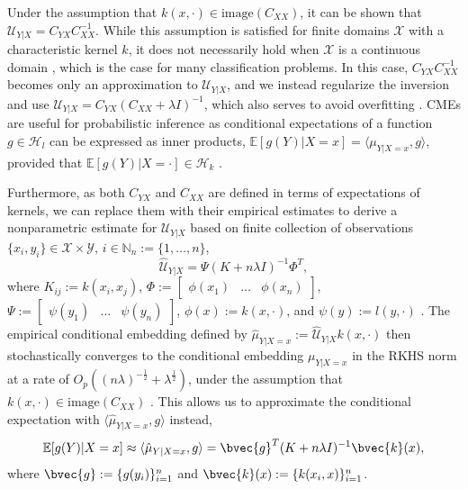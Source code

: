 \documentclass{llncs}
\begin{document}
	Under the assumption that $k(x, \cdot) \in \mathrm{image}(C_{XX})$, it can be shown that $\mathcal{U}_{Y | X} = C_{YX} C_{XX}^{-1}$. While this assumption is satisfied for finite domains $\mathcal{X}$ with a characteristic kernel $k$, it does not necessarily hold when $\mathcal{X}$ is a continuous domain \citep{fukumizu2004dimensionality}, which is the case for many classification problems. In this case, $C_{YX} C_{XX}^{-1}$ becomes only an approximation to $\mathcal{U}_{Y | X}$, and we instead regularize the inversion and use $\mathcal{U}_{Y | X} = C_{YX} (C_{XX} + \lambda I)^{-1}$, which also serves to avoid overfitting \citep{song2013kernel}. \glspl{CME} are useful for probabilistic inference as conditional expectations of a function $g \in \mathcal{H}_{l}$ can be expressed as inner products, $\mathbb{E}[g(Y) | X = x] = \langle \mu_{Y | X = x}, g \rangle$, provided that $\mathbb{E}[g(Y) | X = \cdot] \in \mathcal{H}_{k}$ \citep[Theorem 4]{song2009hilbert}.
	
	Furthermore, as both $C_{YX}$ and $C_{XX}$ are defined in terms of expectations of kernels, we can replace them with their empirical estimates to derive a nonparametric estimate for $\mathcal{U}_{Y | X}$ based on finite collection of observations $\{x_{i}, y_{i}\} \in \mathcal{X} \times \mathcal{Y}$, $i \in \mathbb{N}_{n} := \{1, \dots, n\}$,
	\begin{equation}
	\hat{\mathcal{U}}_{Y | X} = \Psi (K + n \lambda I)^{-1} \Phi^{T},
	\label{eq:empirical_conditional_embedding}
	\end{equation}
	where $K_{ij} := k(x_{i}, x_{j})$, $\Phi := \begin{bmatrix} \phi(x_{1}) & \dots & \phi(x_{n}) \end{bmatrix}$, $\Psi := \begin{bmatrix} \psi(y_{1}) & \dots & \psi(y_{n}) \end{bmatrix}$, $\phi(x) := k(x, \cdot)$, and $\psi(y) := l(y, \cdot)$ \citep{song2013kernel}. The empirical conditional embedding defined by $\hat{\mu}_{Y | X = x} := \hat{\mathcal{U}}_{Y | X} k(x, \cdot)$ then stochastically converges to the conditional embedding $\mu_{Y | X = x}$ in the RKHS norm at a rate of $O_{p}((n \lambda)^{-\frac{1}{2}} + \lambda^{\frac{1}{2}})$, under the assumption that $k(x, \cdot) \in \mathrm{image}(C_{XX})$ \cite[Theorem 6]{song2009hilbert}. This allows us to approximate the conditional expectation with $\langle \hat{\mu}_{Y | X = x}, g \rangle$ instead, 
	\begin{equation}
	\mathbb{E}[g(Y) | X = x] \approx \langle \hat{\mu}_{Y | X = x}, g \rangle = \bvec{g}^{T} (K + n \lambda I)^{-1} \bvec{k}(x),
	\label{eq:empirical_conditional_expectation}
	\end{equation}
	where $\bvec{g} := \{g(y_{i})\}_{i = 1}^{n}$ and $\bvec{k}(x) := \{k(x_{i}, x)\}_{i = 1}^{n}$.
	
\end{document}
